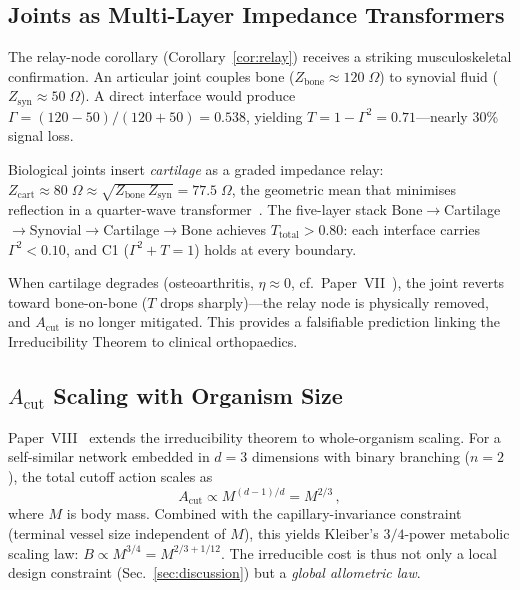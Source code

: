 \documentclass[aps,pre,twocolumn,superscriptaddress,floatfix]{revtex4-2}
\newcommand{\Acut}{A_{\text{cut}}}
\begin{document}
\subsection{Joints as Multi-Layer Impedance Transformers}
\label{sec:joint}

The relay-node corollary (Corollary~\ref{cor:relay}) receives
a striking musculoskeletal confirmation.
An articular joint couples bone ($Z_{\text{bone}} \approx 120\;\Omega$)
to synovial fluid ($Z_{\text{syn}} \approx 50\;\Omega$).
A direct interface would produce
$\Gamma = (120-50)/(120+50) = 0.538$, yielding
$T = 1 - \Gamma^2 = 0.71$---nearly 30\% signal loss.

Biological joints insert \emph{cartilage} as a graded
impedance relay: $Z_{\text{cart}} \approx 80\;\Omega
\approx \sqrt{Z_{\text{bone}}\,Z_{\text{syn}}} = 77.5\;\Omega$,
the geometric mean that minimises reflection in a
quarter-wave transformer~\cite{Pozar2011}.
The five-layer stack
Bone$\to$Cartilage$\to$Synovial$\to$Cartilage$\to$Bone
achieves $T_{\text{total}} > 0.80$:
each interface carries $\Gamma^2 < 0.10$, and C1
($\Gamma^2 + T = 1$) holds at every boundary.

When cartilage degrades (osteoarthritis, $\eta \approx 0$,
cf.\ Paper~VII~\cite{PaperVII}), the joint reverts toward
bone-on-bone ($T$ drops sharply)---the relay node is
physically removed, and $\Acut$ is no longer mitigated.
This provides a falsifiable prediction linking
the Irreducibility Theorem to clinical orthopaedics.

\subsection{$\Acut$ Scaling with Organism Size}
\label{sec:acut-scaling}

Paper~VIII~\cite{PaperVIII} extends the irreducibility
theorem to whole-organism scaling.
For a self-similar network embedded in $d = 3$ dimensions
with binary branching ($n = 2$), the total cutoff action
scales as
\begin{equation}
  \Acut \propto M^{(d-1)/d} = M^{2/3}\,,
  \label{eq:acut-scaling}
\end{equation}
where $M$ is body mass.
Combined with the capillary-invariance constraint
(terminal vessel size independent of $M$), this yields
Kleiber's $3/4$-power metabolic scaling law:
$B \propto M^{3/4} = M^{2/3 + 1/12}$.
The irreducible cost is thus not only a local design
constraint (Sec.~\ref{sec:discussion}) but a
\emph{global allometric law}.
\end{document}
